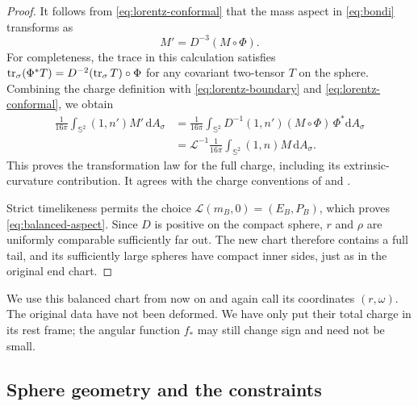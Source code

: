 \begin{proof}
It follows from \eqref{eq:lorentz-conformal} that the mass aspect in
\eqref{eq:bondi} transforms as
\[
 M'=D^{-3}(M\circ\Phi).
\]
For completeness, the trace in this calculation satisfies
$\operatorname{tr}_\sigma(\Phi^*T)=D^{-2}(\operatorname{tr}_\sigma T)\circ\Phi$ for any
covariant two-tensor $T$ on the sphere. Combining the charge definition
with \eqref{eq:lorentz-boundary} and \eqref{eq:lorentz-conformal}, we obtain
\begin{align*}
 \frac{1}{16\pi}\int_{\mathbb S^2}(1,n')M'\,\mathrm dA_\sigma
 &=\frac{1}{16\pi}\int_{\mathbb S^2}
       D^{-1}(1,n')(M\circ\Phi)\,\Phi^*\mathrm dA_\sigma\\
 &=\mathscr L^{-1}\frac{1}{16\pi}\int_{\mathbb S^2}
       (1,n)M\,\mathrm dA_\sigma.
\end{align*}
This proves the transformation law for the full charge, including its
extrinsic-curvature contribution. It agrees with the charge conventions
of \cite[Remark~2.1]{CKS} and \cite[Definitions~1.3--1.4]{CWY}.

Strict timelikeness permits the choice
$\mathscr L(m_B,0)=(E_B,P_B)$, which proves
\eqref{eq:balanced-aspect}. Since $D$ is positive on the compact sphere,
$r$ and $\rho$ are uniformly comparable sufficiently far out. The new
chart therefore contains a full tail, and its sufficiently large
spheres have compact inner sides, just as in the original end chart.
\end{proof}

We use this balanced chart from now on and again call its coordinates
$(r,\omega)$. The original data have not been deformed. We have only
put their total charge in its rest frame; the angular function $f_*$
may still change sign and need not be small.

\subsection{Sphere geometry and the constraints}

